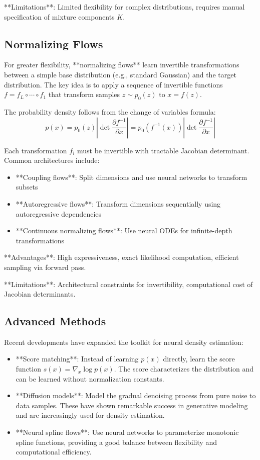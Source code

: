\documentclass[11pt,a4paper]{article}
\theoremstyle{definition}
\begin{document}
**Limitations**: Limited flexibility for complex distributions, requires manual specification of mixture components $K$.

\subsection{Normalizing Flows}

For greater flexibility, **normalizing flows** learn invertible transformations between a simple base distribution (e.g., standard Gaussian) and the target distribution. The key idea is to apply a sequence of invertible functions $f = f_L \circ \cdots \circ f_1$ that transform samples $z \sim p_0(z)$ to $x = f(z)$.

The probability density follows from the change of variables formula:
\begin{equation}
    p(x) = p_0(z) \left| \det \frac{\partial f^{-1}}{\partial x} \right| = p_0(f^{-1}(x)) \left| \det \frac{\partial f^{-1}}{\partial x} \right|
\end{equation}

Each transformation $f_i$ must be invertible with tractable Jacobian determinant. Common architectures include:
\begin{itemize}
    \item **Coupling flows**: Split dimensions and use neural networks to transform subsets
    \item **Autoregressive flows**: Transform dimensions sequentially using autoregressive dependencies
    \item **Continuous normalizing flows**: Use neural ODEs for infinite-depth transformations
\end{itemize}

**Advantages**: High expressiveness, exact likelihood computation, efficient sampling via forward pass.

**Limitations**: Architectural constraints for invertibility, computational cost of Jacobian determinants.

\subsection{Advanced Methods}

Recent developments have expanded the toolkit for neural density estimation:

\begin{itemize}
    \item **Score matching**: Instead of learning $p(x)$ directly, learn the score function $s(x) = \nabla_x \log p(x)$. The score characterizes the distribution and can be learned without normalization constants.
    
    \item **Diffusion models**: Model the gradual denoising process from pure noise to data samples. These have shown remarkable success in generative modeling and are increasingly used for density estimation.
    
    \item **Neural spline flows**: Use neural networks to parameterize monotonic spline functions, providing a good balance between flexibility and computational efficiency.
\end{itemize}
\end{document}
